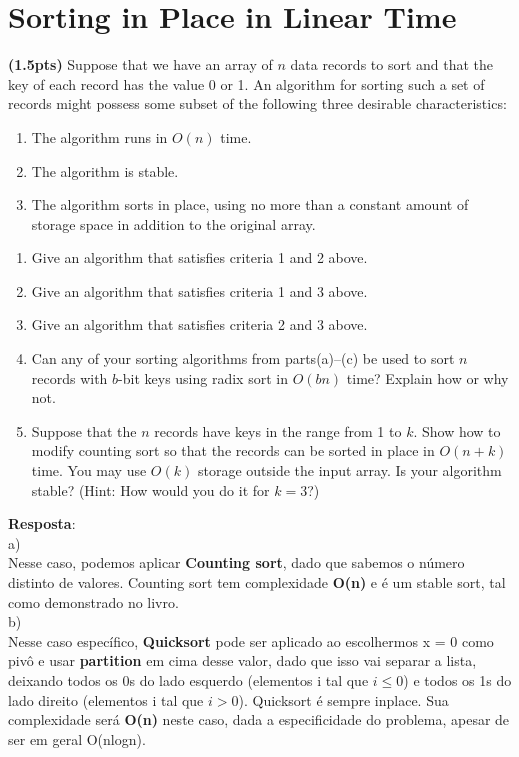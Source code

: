 \documentclass{article}
\begin{document}
\section{Sorting in Place in Linear Time}
\textbf{(1.5pts)} Suppose that we have an array of $n$ data records to sort and that the key of each record has the value 0 or 1. An algorithm for sorting such a set of records might possess some subset of the following three desirable characteristics:

\begin{enumerate}
  \item The algorithm runs in $O(n)$ time.
  \item The algorithm is stable.
  \item The algorithm sorts in place, using no more than a constant amount of storage space in addition to the original array.
\end{enumerate}

\begin{enumerate}[label=(\alph*)]
  \item Give an algorithm that satisfies criteria 1 and 2 above.
  \item Give an algorithm that satisfies criteria 1 and 3 above.
  \item Give an algorithm that satisfies criteria 2 and 3 above.
  \item Can any of your sorting algorithms from parts(a)–(c) be used to sort $n$ records with $b$-bit keys using radix sort in $O(bn)$ time? Explain how or why not.
  \item Suppose that the $n$ records have keys in the range from 1 to $k$. Show how to modify counting sort so that the records can be sorted in place in $O(n + k)$ time. You may use $O(k)$ storage outside the input array. Is your algorithm stable? (Hint: How would you do it for $k = 3$?)

\end{enumerate}

\textbf{Resposta}:\\

a) \\
Nesse caso, podemos aplicar \textbf{Counting sort}, dado que sabemos o número distinto de valores. Counting sort tem complexidade \textbf{O(n)} e é um stable sort, tal como demonstrado no livro.\\

b) \\
Nesse caso específico, \textbf{Quicksort }pode ser aplicado ao escolhermos x = 0 como pivô e usar \textbf{partition} em cima desse valor, dado que isso vai separar a lista, deixando todos os 0s do lado esquerdo (elementos i tal que $i\leq0$) e todos os 1s do lado direito (elementos i tal que $i>0$). Quicksort é sempre inplace. Sua complexidade será \textbf{O(n)} neste caso, dada a especificidade do problema, apesar de ser em geral O(nlogn). \\
\end{document}

